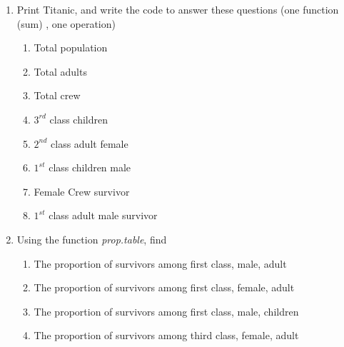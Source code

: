\documentclass[11pt,a4paper]{article}
\newcommand{\1}{\mathbb{1}}
\begin{document}
\begin{Exercise}[title=Object Manipulation]
\begin{enumerate}
\item Print Titanic, and write the code to answer these questions (one function (sum) , one operation)
\begin{enumerate}
\item Total population
\item Total adults
\item Total crew
\item $3^{rd}$ class children
\item $2^{nd}$ class adult female
\item $1^{st}$ class children male
\item Female Crew survivor
\item $1^{st}$ class adult male survivor
\end{enumerate}
\item Using the function \emph{prop.table}, find
\begin{enumerate}
\item The proportion of survivors among first class, male, adult
\item The proportion of survivors among first class, female, adult
\item The proportion of survivors among first class, male, children
\item The proportion of survivors among third class, female, adult
\end{enumerate}
\end{enumerate}
\end{Exercise}
\end{document}
